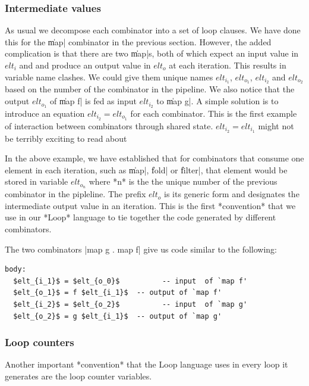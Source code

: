 \documentclass[preamble.tex]{subfiles}
\begin{document}
\subsubsection{\label{sec:Loop:Elts}Intermediate values}

As usual we decompose each combinator into a set of loop clauses. We have done this for the \|map| combinator in the previous section. However, the added complication is that there are two \|map|s, both of which expect an input value in $elt_i$ and and produce an output value in $elt_o$ at each iteration. This results in variable name clashes. We could give them unique names $elt_{i_1}$, $elt_{o_1}$, $elt_{i_2}$ and $elt_{o_2}$ based on the number of the combinator in the pipeline. We also notice that the output $elt_{o_1}$ of \|map f| is fed as input $elt_{i_2}$ to \|map g|. A simple solution is to introduce an equation $elt_{i_2} = elt_{o_1}$ for each combinator. This is the first example of interaction between combinators through shared state.
 $elt_{i_2} = elt_{i_1}$ might not be terribly exciting to read about

In the above example, we have established that for combinators that consume one element in each iteration, such as \|map|, \|fold| or \|filter|, that element would be stored in variable $elt_{o_n}$ where *n* is the the unique number of the previous combinator in the pipleline. The prefix $elt_o$ is its generic form and designates the intermediate output value in an iteration. This is the first *convention* that we use in our *Loop* language to tie together the code generated by different combinators.

The two combinators |map g . map f| give us code similar to the following:

\begin{lstlisting}[mathescape]
body:
  $elt_{i_1}$ = $elt_{o_0}$          -- input  of `map f'
  $elt_{o_1}$ = f $elt_{i_1}$  -- output of `map f'
  $elt_{i_2}$ = $elt_{o_2}$          -- input  of `map g'
  $elt_{o_2}$ = g $elt_{i_1}$  -- output of `map g'
\end{lstlisting}

\subsubsection{Loop counters}

Another important *convention* that the Loop language uses in every loop it generates are the loop counter variables.
\end{document}
